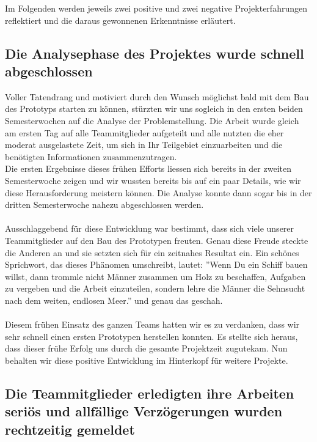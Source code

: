 Im  Folgenden werden jeweils zwei positive und zwei negative Projekterfahrungen reflektiert und die daraus gewonnenen Erkenntnisse erläutert.

\subsection{Die Analysephase des Projektes wurde schnell abgeschlossen}

Voller Tatendrang und motiviert durch den Wunsch möglichst bald mit dem Bau des Prototyps starten zu können, stürzten wir uns sogleich in den ersten beiden Semesterwochen auf die Analyse der Problemstellung. Die Arbeit wurde gleich am ersten Tag auf alle Teammitglieder aufgeteilt und alle nutzten die eher moderat ausgelastete Zeit, um sich in Ihr Teilgebiet einzuarbeiten und die benötigten Informationen zusammenzutragen.\\
Die ersten Ergebnisse dieses frühen Efforts liessen sich bereits in der zweiten Semesterwoche zeigen und wir wussten bereits bis auf ein paar Details, wie wir diese Herausforderung meistern können. Die Analyse konnte dann sogar bis in der dritten Semesterwoche nahezu abgeschlossen werden.\\
\\
Ausschlaggebend für diese Entwicklung war bestimmt, dass sich viele unserer Teammitglieder auf den Bau des Prototypen freuten. Genau diese Freude steckte die Anderen an und sie setzten sich für ein zeitnahes Resultat ein. Ein schönes Sprichwort, das dieses Phänomen umschreibt, lautet:  ''Wenn Du ein Schiff bauen willst, dann trommle nicht Männer zusammen um Holz zu beschaffen, Aufgaben zu vergeben und die Arbeit einzuteilen, sondern lehre die Männer die Sehnsucht nach dem weiten, endlosen Meer.'' \cite{SCHIFF} und genau das geschah.\\
\\
Diesem frühen Einsatz des ganzen Teams hatten wir es zu verdanken, dass wir sehr schnell einen ersten Prototypen herstellen konnten. Es stellte sich heraus, dass dieser frühe Erfolg uns durch die gesamte Projektzeit zugutekam. Nun behalten wir diese positive Entwicklung im Hinterkopf für weitere Projekte.

\subsection{Die Teammitglieder erledigten ihre Arbeiten seriös und allfällige Verzögerungen wurden rechtzeitig gemeldet}

